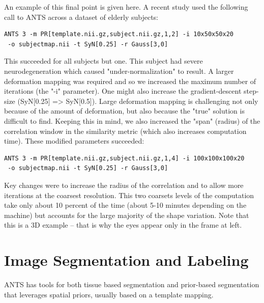 \documentclass{InsightArticle}
\begin{document}
An example of this final point is given here.   
A recent study used the following call to ANTS across a dataset of elderly subjects:
\begin{verbatim}
ANTS 3 -m PR[template.nii.gz,subject.nii.gz,1,2] -i 10x50x50x20
 -o subjectmap.nii -t SyN[0.25] -r Gauss[3,0]
\end{verbatim}
This succeeded for all subjects but one.  This subject had severe neurodegeneration which caused "under-normalization" to result.  A larger deformation mapping was required and so we increased the maximum number of iterations (the "-i" parameter).  One might also increase the gradient-descent step-size (SyN[0.25] => SyN[0.5]).   Large deformation mapping is challenging not only because of the amount of deformation, but also because the "true" solution is difficult to find.  Keeping this in mind, we also increased the "span" (radius) of the correlation window in the similarity metric (which also increases computation time). These modified parameters succeeded: 
\begin{verbatim}
ANTS 3 -m PR[template.nii.gz,subject.nii.gz,1,4] -i 100x100x100x20
 -o subjectmap.nii -t SyN[0.25] -r Gauss[3,0] 
\end{verbatim}
Key changes were to increase the radius of the correlation and to
allow more iterations at the coarsest resolution.  
This two coarsets levels of the computation take only about
10 percent of the time (about 5-10 minutes depending on the machine)
but accounts for the large majority of the shape variation.  Note that
this is a 3D example -- that is why the eyes appear only in the frame
at left. 
\newpage
\section{Image Segmentation and Labeling}
ANTS has tools for both tissue based segmentation and prior-based segmentation that 
leverages spatial priors, usually based on a template mapping.  
\end{document}
